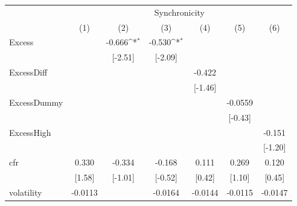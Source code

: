{
\def\sym#1{\ifmmode^{#1}\else\(^{#1}\)\fi}
\begin{tabular}{l*{6}{c}}
\hline\hline
            &\multicolumn{6}{c}{Synchronicity}                                                                                                  \\\cmidrule(lr){2-7}
            &\multicolumn{1}{c}{(1)}         &\multicolumn{1}{c}{(2)}         &\multicolumn{1}{c}{(3)}         &\multicolumn{1}{c}{(4)}         &\multicolumn{1}{c}{(5)}         &\multicolumn{1}{c}{(6)}         \\
\hline
Excess      &                     &      -0.666\sym{*}  &      -0.530\sym{*}  &                     &                     &                     \\
            &                     &     [-2.51]         &     [-2.09]         &                     &                     &                     \\
[1em]
ExcessDiff  &                     &                     &                     &      -0.422         &                     &                     \\
            &                     &                     &                     &     [-1.46]         &                     &                     \\
[1em]
ExcessDummy &                     &                     &                     &                     &     -0.0559         &                     \\
            &                     &                     &                     &                     &     [-0.43]         &                     \\
[1em]
ExcessHigh  &                     &                     &                     &                     &                     &      -0.151         \\
            &                     &                     &                     &                     &                     &     [-1.20]         \\
[1em]
cfr         &       0.330         &      -0.334         &      -0.168         &       0.111         &       0.269         &       0.120         \\
            &      [1.58]         &     [-1.01]         &     [-0.52]         &      [0.42]         &      [1.10]         &      [0.45]         \\
[1em]
volatility  &     -0.0113         &                     &     -0.0164         &     -0.0144         &     -0.0115         &     -0.0147         \\

\end{tabular}}
